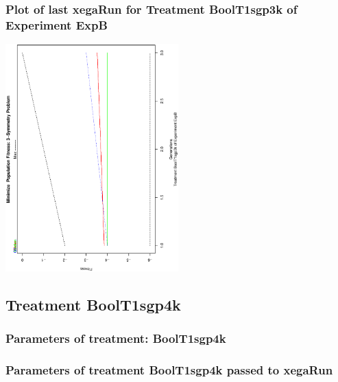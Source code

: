 \documentclass[18pt,c]{beamer}
\makeatletter
\def\beamer@writeslidentry@miniframesoff{%
  \expandafter\beamer@ifempty\expandafter{\beamer@framestartpage}{}%
  {%
   \clearpage\beamer@notesactions%
  }
}
\newcommand*{\miniframesoff}{\let\beamer@writeslidentry=\beamer@writeslidentry@miniframesoff}
\makeatother
\begin{document}
 \begin{frame}
 \frametitle{ Plot of last xegaRun for Treatment BoolT1sgp3k of Experiment ExpB }
 \begin{center}
\includegraphics[width=0.5\textwidth, angle=-90]
{ExpBPlotPopStatsFigure006.eps}
 \end{center}
 \label{report/ExpBPlotPopStatsFigure006.eps}  
 \end{frame}

\miniframesoff
\subsection{Treatment BoolT1sgp4k}

 \begin{frame}
 \fontsize{8pt}{9pt}\selectfont
 \frametitle{  Parameters of treatment: BoolT1sgp4k 
 }

 \label{ExpBtParmTable028.tex}  
 \end{frame}


 \begin{frame}
 \fontsize{8pt}{9pt}\selectfont
 \frametitle{  Parameters of treatment BoolT1sgp4k passed to xegaRun
 }

 \label{ExpBtParmTable029.tex}  
 \end{frame}
\end{document}
